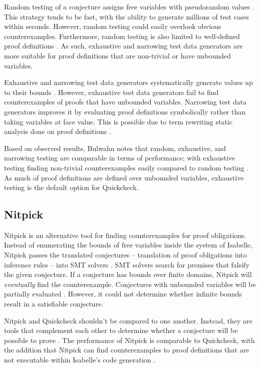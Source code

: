 Random testing of a conjecture assigns free variables with pseudorandom values \cite[Sec. 3.1]{isabelleQuickcheck}. This strategy tends to be fast, 
with the ability to generate millions of test cases within seconds. However, random testing could easily overlook obvious counterexamples. 
Furthermore, random testing is also limited to well-defined proof definitions \cite{isabelleQuickcheck}. As such, exhaustive and narrowing 
test data generators are more suitable for proof definitions that are non-trivial or have unbounded variables.

Exhaustive and narrowing test data generators systematically generate values up to their bounds \cite{isabelleQuickcheck}. 
However, exhaustive test data generators fail to find counterexamples of proofs that have unbounded variables. Narrowing test data generators 
improves it by evaluating proof definitions symbolically rather than taking variables at face value. This is possible due to 
term rewriting static analysis done on proof definitions \cite[Sec. 5]{isabelleQuickcheck}.

Based on observed results, Bulwahn notes that random, exhaustive, and narrowing testing are comparable in terms of performance; with 
exhaustive testing finding non-trivial counterexamples easily compared to random testing \cite[Sec. 7]{isabelleQuickcheck}. As much of  
proof definitions are defined over unbounded variables, exhaustive testing is the default option for Quickcheck.

\subsection{Nitpick}
\label{sec:Nitpick}

Nitpick is an alternative tool for finding counterexamples for proof obligations. Instead of enumerating the bounds of free variables inside the 
system of Isabelle, Nitpick passes the translated conjectures -- translation of proof obligations into inference rules -- into SMT solvers 
\cite[Sec. 5]{isabelleProof}. SMT solvers search for premises that falsify the given conjecture. If a conjecture 
has bounds over finite domains, Nitpick will \emph{eventually} find the counterexample. Conjectures with unbounded variables will be partially 
evaluated \cite[Sec. 5.2]{isabelleProof}. However, it could not determine whether infinite bounds result in a satisfiable conjecture.

Nitpick and Quickcheck shouldn't be compared to one another. Instead, they are tools that complement each other to determine 
whether a conjecture will be possible to prove \cite{isabelleQuickcheck}. The performance of Nitpick is comparable to Quickcheck, with 
the addition that Nitpick can find counterexamples to proof definitions that are not executable within Isabelle's code generation 
\cite[Sec. 7]{isabelleQuickcheck}.

